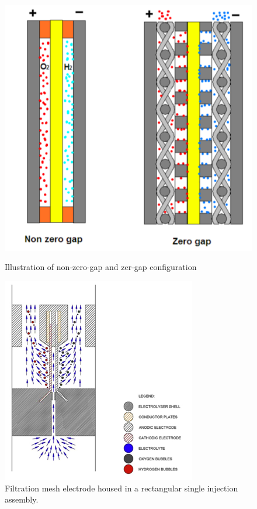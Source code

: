\begin{figure}[!htb]
   \begin{minipage}{0.48\textwidth}
     \centering
     \includegraphics[width=.7\linewidth]{zerogap.png}
     \caption{Illustration of non-zero-gap and zer-gap configuration\cite{cathode2}}\label{Fig:Data1}
   \end{minipage}\hfill
   \begin {minipage}{0.48\textwidth}
     \centering
     \includegraphics[width=.7\linewidth]{membraneless.png}
     \caption{Filtration mesh electrode housed in a rectangular single injection assembly.\cite{membraneless}}\label{Fig:Data2}
   \end{minipage}
\end{figure}

